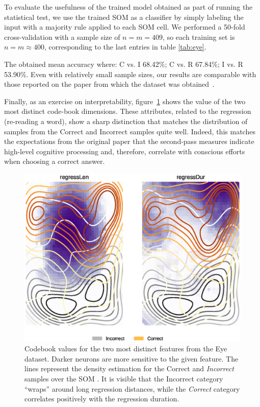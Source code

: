 To evaluate the usefulness of the trained model obtained as part of running the
statistical test, we use the trained \gls{SOM}  as a classifier by simply labeling
the input with a majority rule applied to each \gls{SOM}  cell. We performed a
50-fold cross-validation with a sample size of $n=m=409$, so each training set
is $n=m\approx 400$, corresponding
to the last entries in table \ref{tab:eye}.

The obtained mean accuracy where: C vs. I 68.42\%; C vs. R 67.84\%; I vs. R 53.90\%.
Even with relatively small sample sizes, our results are comparable with those
reported on the paper from which the dataset was obtained~\cite{salojarvi2005inferring}.

Finally, as an exercise on interpretability, figure~\ref{fig:eye_distinct_features}
shows the value of the two most distinct code-book dimensions. These attributes,
related to the regression (re-reading a word), show a sharp distinction that
matches the distribution of samples from the Correct and Incorrect samples quite
well.
Indeed, this matches the expectations from the original paper that the second-pass
measures indicate high-level cognitive processing and, therefore, correlate with
conscious efforts when choosing a correct answer.

\begin{figure}[htb]
    \centering
    \includegraphics[width=\textwidth]{images/4_som/eye_regress.eps}
    \caption{Codebook values for the two most distinct features from the Eye dataset.
    Darker neurons are more sensitive to the given feature.
    The lines represent the density estimation for the Correct and \emph{Incorrect} samples over the \gls{SOM} .
    It is visible that the Incorrect category ``wraps'' around long regression distances, while the
    \emph{Correct} category correlates positively with the regression duration.}
    \label{fig:eye_distinct_features}
\end{figure}


